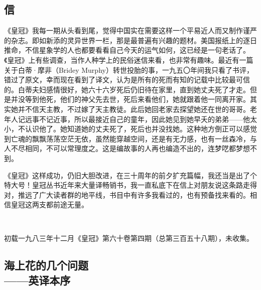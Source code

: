 \subsection{信}


\par 《皇冠》我每一期从头看到尾，觉得中国实在需要这样一个平易近人而又制作谨严的杂志。即如新添的灵异世界一栏，那是最普遍有兴趣的题材。美国报纸上的逐日推命，不信星象学的人也都要看看自己今天的运气如何，这已经是一句老话了。《皇冠》上有些调查，当作人种学上的民俗迷信来看，也非常有趣味。最近有一篇关于白蒂·摩非（Bridey Murphy）转世投胎的事，一九五〇年间我只看了书评，错过了原文，幸而现在看到了译文，认为是所有的死而有知的记载中比较最可信的。白蒂夫妇感情很好，她六十六岁死后仍旧待在家里，直到她丈夫死了才走。但是并没等到他死，他们的神父先去世，死后来看他们，她就跟着他一同离开家。其实她并不信天主教，不过嫁了天主教徒。此后她回老家去探望她还在世的哥哥。老年人记远事不记近事，所以最接近自己的童年，因此她见到她早夭的弟弟——他太小，不认识他了。她知道她的丈夫死了，死后也并没找她。这种地方倒正可以感觉到亡魂的飘飘荡荡空茫无依，虽然能穿越空间，还是有无力感，也有一丝森冷，与人不尽相同，不可以常理度之。这是编故事的人再也编造不出的，连梦呓都梦想不到。
\par 《皇冠》这样成功，仍旧大胆改进，在三十周年的前夕扩充篇幅，我还当是出了个特大号！皇冠丛书近年来大量译畅销书，我一直私底下在信上对朋友说这条路走得对，推远了广大读者群的地平线，书目中有许多我看过的，也有预备找来看的。相信皇冠这两支都前途无量。
\par  
\par *初载一九八三年十二月《皇冠》第六十卷第四期（总第三百五十八期），未收集。



\subsection{海上花的几个问题\\\small{——英译本序}}


